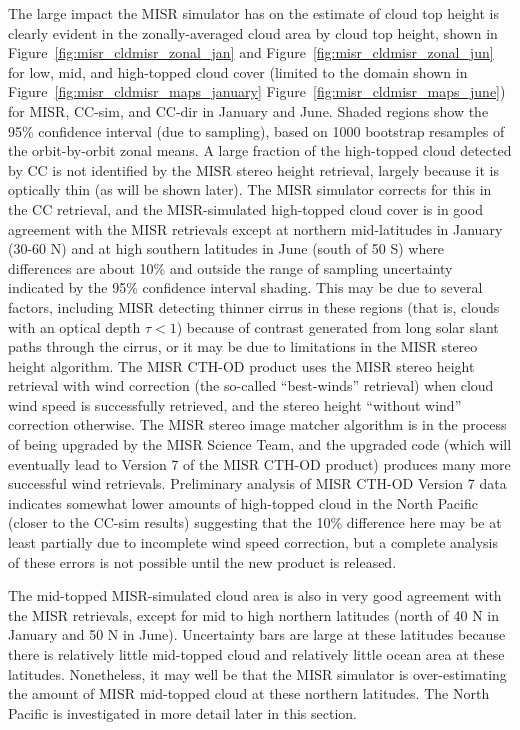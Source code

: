 The large impact the MISR simulator has on the estimate of cloud top
height is clearly evident in the zonally-averaged cloud area by cloud
top height, shown in Figure~\ref{fig:misr_cldmisr_zonal_jan} and
Figure~\ref{fig:misr_cldmisr_zonal_jun} for low, mid, and high-topped
cloud cover (limited to the domain shown in
Figure~\ref{fig:misr_cldmisr_maps_january}
Figure~\ref{fig:misr_cldmisr_maps_june}) for MISR, CC-sim, and CC-dir in
January and June. Shaded regions show the 95\% confidence interval (due
to sampling), based on 1000 bootstrap resamples of the orbit-by-orbit
zonal means. A large fraction of the high-topped cloud detected by CC is
not identified by the MISR stereo height retrieval, largely because it
is optically thin (as will be shown later). The MISR simulator corrects
for this in the CC retrieval, and the MISR-simulated high-topped cloud
cover is in good agreement with the MISR retrievals except at northern
mid-latitudes in January (30-60 N) and at high southern latitudes in
June (south of 50 S) where differences are about 10\% and outside the
range of sampling uncertainty indicated by the 95\% confidence interval
shading. This may be due to several factors, including MISR detecting
thinner cirrus in these regions (that is, clouds with an optical depth
\(\tau < 1\)) because of contrast generated from long solar slant paths
through the cirrus, or it may be due to limitations in the MISR stereo
height algorithm. The MISR CTH-OD product uses the MISR stereo height
retrieval with wind correction (the so-called ``best-winds'' retrieval)
when cloud wind speed is successfully retrieved, and the stereo height
``without wind'' correction otherwise. The MISR stereo image matcher
algorithm is in the process of being upgraded by the MISR Science Team,
and the upgraded code (which will eventually lead to Version 7 of the
MISR CTH-OD product) produces many more successful wind retrievals.
Preliminary analysis of MISR CTH-OD Version 7 data indicates somewhat
lower amounts of high-topped cloud in the North Pacific (closer to the
CC-sim results) suggesting that the 10\% difference here may be at least
partially due to incomplete wind speed correction, but a complete
analysis of these errors is not possible until the new product is
released.

The mid-topped MISR-simulated cloud area is also in very good agreement
with the MISR retrievals, except for mid to high northern latitudes
(north of 40 N in January and 50 N in June). Uncertainty bars are large
at these latitudes because there is relatively little mid-topped cloud
and relatively little ocean area at these latitudes. Nonetheless, it may
well be that the MISR simulator is over-estimating the amount of MISR
mid-topped cloud at these northern latitudes. The North Pacific is
investigated in more detail later in this section.

